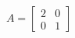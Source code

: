 \documentclass[preview]{standalone}
\begin{document}
\begin{align*}
A = \begin{bmatrix} 2 & 0 \\ 0 & 1 \end{bmatrix}
\end{align*}
\end{document}
